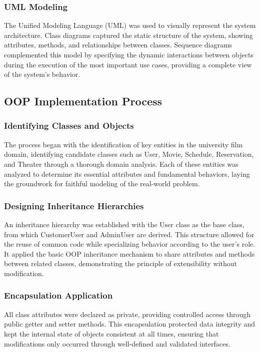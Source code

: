 \documentclass[12pt]{article}
\begin{document}
\subsubsection{UML Modeling}
The Unified Modeling Language (UML) was used to visually represent the system architecture. Class diagrams captured the static structure of the system, showing attributes, methods, and relationships between classes. Sequence diagrams complemented this model by specifying the dynamic interactions between objects during the execution of the most important use cases, providing a complete view of the system's behavior.

\subsection{OOP Implementation Process}

\subsubsection{Identifying Classes and Objects}
The process began with the identification of key entities in the university film domain, identifying candidate classes such as User, Movie, Schedule, Reservation, and Theater through a thorough domain analysis. Each of these entities was analyzed to determine its essential attributes and fundamental behaviors, laying the groundwork for faithful modeling of the real-world problem.

\subsubsection{Designing Inheritance Hierarchies}
An inheritance hierarchy was established with the User class as the base class, from which CustomerUser and AdminUser are derived. This structure allowed for the reuse of common code while specializing behavior according to the user's role. It applied the basic OOP inheritance mechanism to share attributes and methods between related classes, demonstrating the principle of extensibility without modification.

\subsubsection{Encapsulation Application}
All class attributes were declared as private, providing controlled access through public getter and setter methods. This encapsulation protected data integrity and kept the internal state of objects consistent at all times, ensuring that modifications only occurred through well-defined and validated interfaces.
\end{document}
